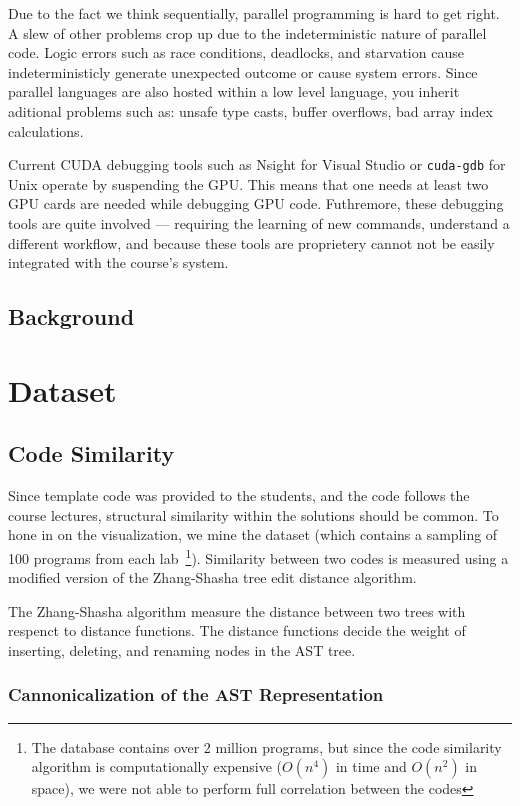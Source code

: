 \documentclass[nocopyrightspace]{sigchi}
\begin{document}
Due to the fact we think sequentially, parallel programming is hard to get
right. A slew of other problems crop up due to the  indeterministic nature of
parallel code. Logic errors such as race conditions, deadlocks, and starvation
cause indeterministicly generate unexpected outcome or cause system errors.
Since parallel languages are also hosted within a low level language,
you inherit aditional problems such as: unsafe type casts, buffer overflows,
bad array index calculations.

Current CUDA debugging tools such as Nsight for Visual Studio or {\tt cuda-gdb}
for Unix operate by suspending the GPU. This means that one needs at least two
GPU cards are needed while debugging GPU code. Futhremore, these debugging tools
are quite involved --- requiring the learning of new commands, understand a
different workflow, and because these tools are proprietery cannot not be easily
integrated with the course's system.


\subsection{Background}

\section{Dataset}


\subsection{Code Similarity}

Since template code was provided to the students, and the code follows the course
lectures, structural similarity within the solutions should be common. To hone in
on the visualization, we mine the dataset (which contains a sampling of 100 programs
from each lab~\footnote{The database contains over 2 million programs, but since
the code similarity algorithm is computationally expensive ($O(n^4)$ in time and $O(n^2)$ in space),
we were not able to perform full correlation between the codes}). Similarity between
two codes is measured using a modified version of the Zhang-Shasha tree edit distance algorithm.

The Zhang-Shasha algorithm measure the distance between two trees with respenct to
distance functions. The distance functions decide the weight of inserting, deleting,
and renaming nodes in the AST tree.

\subsubsection{Cannonicalization of the AST Representation}
\end{document}
